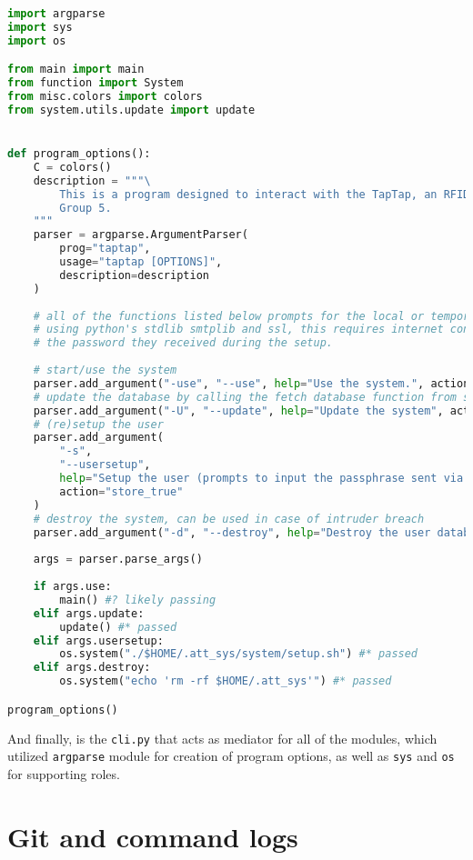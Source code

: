 \documentclass[12pt]{article}
\begin{document}
\singlespacing
\begin{lstlisting}[language=Python, caption={\texttt{code\_email.py}}]
import argparse
import sys
import os

from main import main
from function import System
from misc.colors import colors
from system.utils.update import update


def program_options():
	C = colors()
	description = """\
		This is a program designed to interact with the TapTap, an RFID system designed by Capstone
		Group 5.
	"""
	parser = argparse.ArgumentParser(
		prog="taptap",
		usage="taptap [OPTIONS]",
		description=description
	)
	
	# all of the functions listed below prompts for the local or temporary password email to the user
	# using python's stdlib smtplib and ssl, this requires internet connection, else the user need to
	# the password they received during the setup. 
	
	# start/use the system
	parser.add_argument("-use", "--use", help="Use the system.", action="store_true")
	# update the database by calling the fetch database function from src.function
	parser.add_argument("-U", "--update", help="Update the system", action="store_true")
	# (re)setup the user
	parser.add_argument(
		"-s",
		"--usersetup",
		help="Setup the user (prompts to input the passphrase sent via email, if used again).",
		action="store_true"
	)
	# destroy the system, can be used in case of intruder breach
	parser.add_argument("-d", "--destroy", help="Destroy the user database.", action="store_true")    
	
	args = parser.parse_args()
	
	if args.use:
		main() #? likely passing
	elif args.update:
		update() #* passed
	elif args.usersetup:
		os.system("./$HOME/.att_sys/system/setup.sh") #* passed
	elif args.destroy:
		os.system("echo 'rm -rf $HOME/.att_sys'") #* passed

program_options()
\end{lstlisting}
\doublespacing

And finally, is the \texttt{cli.py} that acts as mediator for all of the modules, which utilized \texttt{argparse} module for creation of program options, as well as \texttt{sys} and \texttt{os} for supporting roles.

\section*{Git and command logs}
\end{document}
